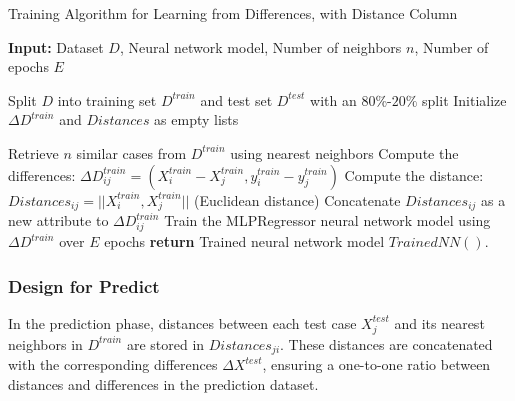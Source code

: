\documentclass[a4paper, 12pt]{report}
\begin{document}
\begin{algorithm}[H]
    \caption{Training Algorithm for Learning from Differences, with Distance Column}
    \label{alg:learning_from_differences_variant_3_train}
    
    \textbf{Input:} Dataset $D$, Neural network model, Number of neighbors $n$, Number of epochs $E$
    
    \begin{algorithmic}[1]
        \State Split $D$ into training set $D^{train}$ and test set $D^{test}$ with an 80\%-$20\%$ split
        \State Initialize $\Delta D^{train}$ and $Distances$ as empty lists
        
            \State Retrieve $n$ similar cases from $D^{train}$ using nearest neighbors
                \State Compute the differences: $\Delta D^{train}_{ij} = (X^{train}_i - X^{train}_j, y^{train}_i - y^{train}_j)$
                \State Compute the distance: $Distances_{ij} = ||X^{train}_i, X^{train}_j||$ (Euclidean distance)
                \State Concatenate $Distances_{ij}$ as a new attribute to $\Delta D^{train}_{ij}$
            \EndFor
        \EndFor      
        \State Train the MLPRegressor neural network model using $\Delta D^{train}$ over $E$ epochs  
        \State \textbf{return} Trained neural network model $Trained NN()$.
    \end{algorithmic}
\end{algorithm}

\subsubsection{Design for Predict}
In the prediction phase, distances between each test case $X^{test}_j$ and its nearest neighbors in $D^{train}$ are stored in $Distances_{ji}$.
These distances are concatenated with the corresponding differences $\Delta X^{test}$, ensuring a one-to-one ratio between distances and differences in the prediction dataset.
\end{document}
